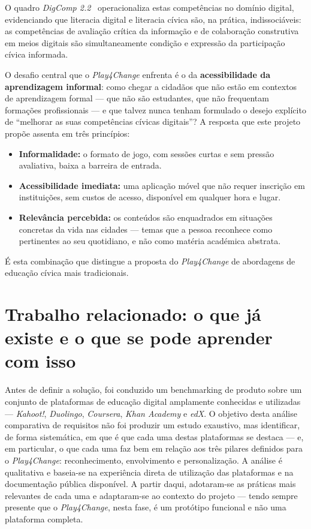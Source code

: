 O quadro \emph{DigComp 2.2}~\cite{vuorikari2022digcomp} operacionaliza estas competências no domínio digital, evidenciando que literacia digital e literacia cívica são, na prática, indissociáveis: as competências de avaliação crítica da informação e de colaboração construtiva em meios digitais são simultaneamente condição e expressão da participação cívica informada.

O desafio central que o \emph{Play4Change} enfrenta é o da \textbf{acessibilidade da aprendizagem informal}: como chegar a cidadãos que não estão em contextos de aprendizagem formal --- que não são estudantes, que não frequentam formações profissionais --- e que talvez nunca tenham formulado o desejo explícito de ``melhorar as suas competências cívicas digitais''? A resposta que este projeto propõe assenta em três princípios:

\begin{itemize}
    \item \textbf{Informalidade:} o formato de jogo, com sessões curtas e sem pressão avaliativa, baixa a barreira de entrada.
    \item \textbf{Acessibilidade imediata:} uma aplicação móvel que não requer inscrição em instituições, sem custos de acesso, disponível em qualquer hora e lugar.
    \item \textbf{Relevância percebida:} os conteúdos são enquadrados em situações concretas da vida nas cidades --- temas que a pessoa reconhece como pertinentes ao seu quotidiano, e não como matéria académica abstrata.
\end{itemize}

É esta combinação que distingue a proposta do \emph{Play4Change} de abordagens de educação cívica mais tradicionais.

\section{Trabalho relacionado: o que já existe e o que se pode aprender com isso}
\label{sec:trabalho-relacionado}

Antes de definir a solução, foi conduzido um benchmarking de produto sobre um conjunto de plataformas de educação digital amplamente conhecidas e utilizadas --- \emph{Kahoot!}, \emph{Duolingo}, \emph{Coursera}, \emph{Khan Academy} e \emph{edX}. O objetivo desta análise comparativa de requisitos não foi produzir um estudo exaustivo, mas identificar, de forma sistemática, em que é que cada uma destas plataformas se destaca --- e, em particular, o que cada uma faz bem em relação aos três pilares definidos para o \emph{Play4Change}: reconhecimento, envolvimento e personalização. A análise é qualitativa e baseia-se na experiência direta de utilização das plataformas e na documentação pública disponível. A partir daqui, adotaram-se as práticas mais relevantes de cada uma e adaptaram-se ao contexto do projeto --- tendo sempre presente que o \emph{Play4Change}, nesta fase, é um protótipo funcional e não uma plataforma completa.

